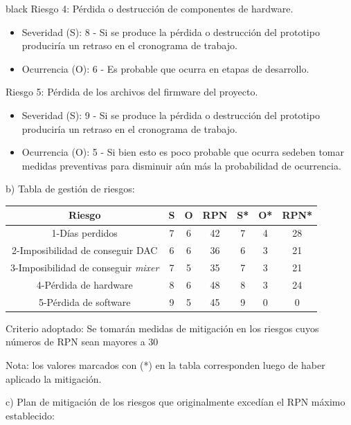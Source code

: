 \documentclass[11pt]{charter}
\begin{document}
\begin{consigna}{black}
Riesgo 4:  Pérdida o destrucción de componentes de hardware.
\begin{itemize}
\item Severidad (S): 8 - Si se produce la pérdida o destrucción del prototipo produciría un retraso en el cronograma de trabajo.
\item Ocurrencia (O): 6 - Es probable que ocurra en etapas de desarrollo.
\end{itemize}

Riesgo 5: Pérdida de los archivos del firmware del proyecto.
\begin{itemize}
\item Severidad (S): 9 - Si se produce la pérdida o destrucción del prototipo produciría un retraso en el cronograma de trabajo.
\item Ocurrencia (O): 5 - Si bien esto es poco probable que ocurra sedeben tomar medidas preventivas para disminuir aún más la probabilidad de ocurrencia.
\end{itemize}

b) Tabla de gestión de riesgos:

\begin{table}[H]
\centering
\begin{tabular}{@{}|c|c|c|c|c|c|c|@{}}
\hline
\rowcolor[HTML]{C0C0C0} 
Riesgo & S  & O  & RPN & S* & O* & RPN* \\ \hline
1-Días perdidos      & 7  & 6  & 42  & 7  & 4  &  28  \\ \hline
2-Imposibilidad de conseguir DAC & 6  & 6  & 36  & 6  & 3  &  21  \\ \hline
3-Imposibilidad de conseguir \textit{mixer}      & 7  & 5  & 35  & 7  & 3  &  21  \\ \hline
4-Pérdida de hardware & 8  & 6  & 48  & 8  & 3  &  24  \\ \hline
5-Pérdida de software      & 9  & 5  & 45  & 9  & 0  &  0  \\ \hline
\end{tabular}%
\end{table}

Criterio adoptado: 
Se tomarán medidas de mitigación en los riesgos cuyos números de RPN sean mayores a 30

Nota: los valores marcados con (*) en la tabla corresponden luego de haber aplicado la mitigación.

c) Plan de mitigación de los riesgos que originalmente excedían el RPN máximo establecido:
 

\end{consigna}
\end{document}
